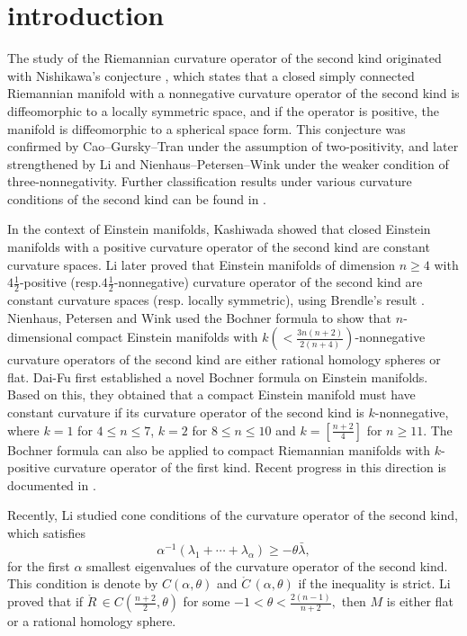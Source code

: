 \documentclass[11pt, reqno]{amsart}
\numberwithin{equation}{section}
\theoremstyle{definition}
\begin{document}
	\pagestyle{fancy}
	\fancyhead{} 
	\fancyfoot{}
	\fancyfoot[CE,CO]{\thepage}
	\section{introduction}\hspace*{5mm}
	
	The study of the Riemannian curvature operator of the second kind originated with Nishikawa’s conjecture \cite{Ni}, which states that a closed simply connected Riemannian manifold with a nonnegative curvature operator of the second kind is diffeomorphic to a locally symmetric space, and if the operator is positive, the manifold is diffeomorphic to a spherical space form. This conjecture was confirmed by Cao–Gursky–Tran \cite{CGT} under the assumption of two-positivity, and later strengthened by Li \cite{Li4} and Nienhaus–Petersen–Wink \cite{NP} under the weaker condition of three-nonnegativity. Further classification results under various curvature conditions of the second kind can be found in \cite{DFD,Li3,Li7,Li6,Li4,Li2,Li5,DF,NP}.
	
	In the context of Einstein manifolds, Kashiwada \cite{KT} showed that closed Einstein manifolds with a positive curvature operator of the second kind are constant curvature spaces. Li \cite{Li3} later proved that Einstein manifolds of dimension $n\ge4$ with $4\frac{1}{2}$-positive (resp.$4\frac{1}{2}$-nonnegative) curvature operator of the second kind are constant curvature spaces (resp. locally symmetric), using Brendle’s result \cite{Brendle}. Nienhaus, Petersen and Wink \cite{NP,NPWW} used the Bochner formula to show that $n$-dimensional compact Einstein manifolds with $k(<\frac{3n(n+2)}{2(n+4)})$-nonnegative curvature operators of the second kind are either rational homology spheres or flat. Dai-Fu \cite{DF} first established a novel Bochner formula on Einstein manifolds. Based on this, they obtained that a compact Einstein manifold must have constant curvature if its curvature operator of the second kind is $k$-nonnegative, where $k=1$ for $4\leq n\leq7$, $k=2$ for $8\leq n\leq10$ and  $k=[\frac{n+2}{4}]$ for $n\geq11$. The Bochner formula can also be applied to compact Riemannian manifolds with $k$-positive curvature operator of the first kind.  Recent progress in this direction is documented in \cite{CMR,PW,BG,YZ,HZ}.
	
	Recently, Li \cite{Li5} studied cone conditions of the curvature operator of the second kind, which satisfies
	$${\alpha }^{-1}({\lambda }_1+\cdots +{\lambda }_{\alpha })\ge -\theta \bar{\lambda },$$
	for  the first $\alpha $ smallest eigenvalues of the curvature operator of the second kind. This condition is denote by $C(\alpha ,\theta )$ and $\mathring{C}\,(\alpha ,\theta )$ if the inequality is strict. Li proved that if $\mathring{R}\,\in C(\frac{n+2}{2},\theta )$ for some $-1<\theta <\frac{2(n-1)}{n+2},$ then $M$ is either flat or a rational homology sphere.
	
\end{document}
